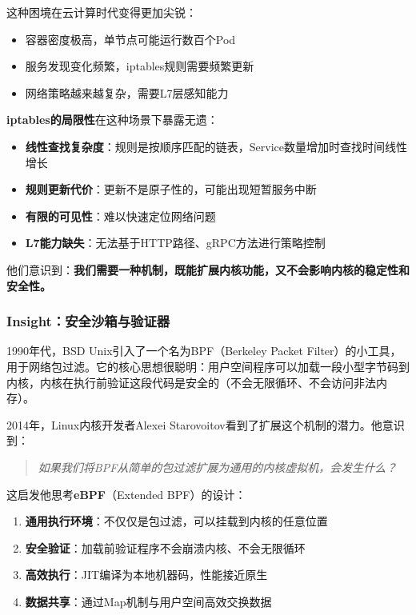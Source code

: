 这种困境在云计算时代变得更加尖锐：
\begin{itemize}
    \item 容器密度极高，单节点可能运行数百个Pod
    \item 服务发现变化频繁，iptables规则需要频繁更新
    \item 网络策略越来越复杂，需要L7层感知能力
\end{itemize}

\textbf{iptables的局限性}在这种场景下暴露无遗：

\begin{itemize}
    \item \textbf{线性查找复杂度}：规则是按顺序匹配的链表，Service数量增加时查找时间线性增长
    \item \textbf{规则更新代价}：更新不是原子性的，可能出现短暂服务中断
    \item \textbf{有限的可见性}：难以快速定位网络问题
    \item \textbf{L7能力缺失}：无法基于HTTP路径、gRPC方法进行策略控制
\end{itemize}

他们意识到：\textbf{我们需要一种机制，既能扩展内核功能，又不会影响内核的稳定性和安全性。}

\subsubsection{Insight：安全沙箱与验证器}

1990年代，BSD Unix引入了一个名为BPF（Berkeley Packet Filter）的小工具，用于网络包过滤。它的核心思想很聪明：用户空间程序可以加载一段小型字节码到内核，内核在执行前验证这段代码是安全的（不会无限循环、不会访问非法内存）。

2014年，Linux内核开发者Alexei Starovoitov看到了扩展这个机制的潜力。他意识到：

\begin{quote}
\textit{如果我们将BPF从简单的包过滤扩展为通用的内核虚拟机，会发生什么？}
\end{quote}

这启发他思考\textbf{eBPF}（Extended BPF）的设计：

\begin{enumerate}
    \item \textbf{通用执行环境}：不仅仅是包过滤，可以挂载到内核的任意位置
    \item \textbf{安全验证}：加载前验证程序不会崩溃内核、不会无限循环
    \item \textbf{高效执行}：JIT编译为本地机器码，性能接近原生
    \item \textbf{数据共享}：通过Map机制与用户空间高效交换数据
\end{enumerate}

